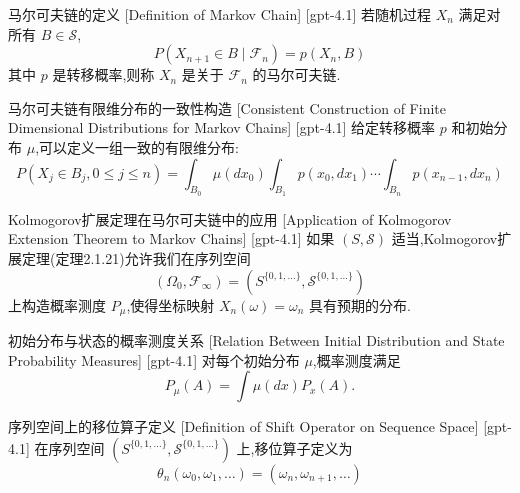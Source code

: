 \documentclass[UTF8]{ctexart}
\begin{document}
    
    
    \begin{dfn}
        {马尔可夫链的定义}
        [Definition of Markov Chain]
        [gpt-4.1]
        若随机过程 $X_{n}$ 满足对所有 $B \in \mathcal{S}$,
\[
P(X_{n+1} \in B \mid \mathcal{F}_{n}) = p(X_{n}, B)
\]
其中 $p$ 是转移概率,则称 $X_{n}$ 是关于 $\mathcal{F}_{n}$ 的马尔可夫链.
    \end{dfn}
    
    
    
    \begin{ppt}
        {马尔可夫链有限维分布的一致性构造}
        [Consistent Construction of Finite Dimensional Distributions for Markov Chains]
        [gpt-4.1]
        给定转移概率 $p$ 和初始分布 $\mu$,可以定义一组一致的有限维分布:
\[
P(X_{j} \in B_{j}, 0 \le j \le n) = \int_{B_{0}} \mu(dx_{0}) \int_{B_{1}} p(x_{0}, dx_{1}) \cdots \int_{B_{n}} p(x_{n-1}, dx_{n})
\]

    \end{ppt}
    
    
    
    \begin{thm}
        {Kolmogorov扩展定理在马尔可夫链中的应用}
        [Application of Kolmogorov Extension Theorem to Markov Chains]
        [gpt-4.1]
        如果 $(S, \mathcal{S})$ 适当,Kolmogorov扩展定理(定理2.1.21)允许我们在序列空间
\[
(\Omega_{0}, \mathcal{F}_{\infty}) = (S^{\{0, 1, \ldots\}}, \mathcal{S}^{\{0, 1, \ldots\}})
\]
上构造概率测度 $P_{\mu}$,使得坐标映射 $X_{n}(\omega) = \omega_{n}$ 具有预期的分布.
    \end{thm}
    
    
    
    \begin{ppt}
        {初始分布与状态的概率测度关系}
        [Relation Between Initial Distribution and State Probability Measures]
        [gpt-4.1]
        对每个初始分布 $\mu$,概率测度满足
\[
P_{\mu}(A) = \int \mu(dx) P_{x}(A).
\]

    \end{ppt}
    
    
    
    \begin{dfn}
        {序列空间上的移位算子定义}
        [Definition of Shift Operator on Sequence Space]
        [gpt-4.1]
        在序列空间 $(S^{\{0, 1, \ldots\}}, \mathcal{S}^{\{0, 1, \ldots\}})$ 上,移位算子定义为
\[
\theta_{n}(\omega_{0}, \omega_{1}, \ldots) = (\omega_{n}, \omega_{n+1}, \ldots)
\]

    \end{dfn}
    
\end{document}
